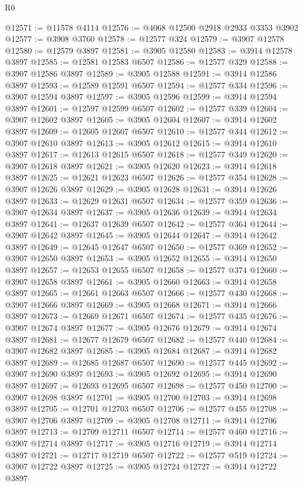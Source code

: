\begin{lexlean}{R0}
\begin{coremodule}
@12571 := @11578 @4114
@12576 := @4068 @12500 @2918 @2933 @3353 @3902
@12577 := @3908 @3760
@12578 := @12577 @324
@12579 := @3907 @12578
@12580 := @12579 @3897
@12581 := @3905 @12580
@12583 := @3914 @12578 @3897
@12585 := @12581 @12583 @6507
@12586 := @12577 @329
@12588 := @3907 @12586 @3897
@12589 := @3905 @12588
@12591 := @3914 @12586 @3897
@12593 := @12589 @12591 @6507
@12594 := @12577 @334
@12596 := @3907 @12594 @3897
@12597 := @3905 @12596
@12599 := @3914 @12594 @3897
@12601 := @12597 @12599 @6507
@12602 := @12577 @339
@12604 := @3907 @12602 @3897
@12605 := @3905 @12604
@12607 := @3914 @12602 @3897
@12609 := @12605 @12607 @6507
@12610 := @12577 @344
@12612 := @3907 @12610 @3897
@12613 := @3905 @12612
@12615 := @3914 @12610 @3897
@12617 := @12613 @12615 @6507
@12618 := @12577 @349
@12620 := @3907 @12618 @3897
@12621 := @3905 @12620
@12623 := @3914 @12618 @3897
@12625 := @12621 @12623 @6507
@12626 := @12577 @354
@12628 := @3907 @12626 @3897
@12629 := @3905 @12628
@12631 := @3914 @12626 @3897
@12633 := @12629 @12631 @6507
@12634 := @12577 @359
@12636 := @3907 @12634 @3897
@12637 := @3905 @12636
@12639 := @3914 @12634 @3897
@12641 := @12637 @12639 @6507
@12642 := @12577 @364
@12644 := @3907 @12642 @3897
@12645 := @3905 @12644
@12647 := @3914 @12642 @3897
@12649 := @12645 @12647 @6507
@12650 := @12577 @369
@12652 := @3907 @12650 @3897
@12653 := @3905 @12652
@12655 := @3914 @12650 @3897
@12657 := @12653 @12655 @6507
@12658 := @12577 @374
@12660 := @3907 @12658 @3897
@12661 := @3905 @12660
@12663 := @3914 @12658 @3897
@12665 := @12661 @12663 @6507
@12666 := @12577 @430
@12668 := @3907 @12666 @3897
@12669 := @3905 @12668
@12671 := @3914 @12666 @3897
@12673 := @12669 @12671 @6507
@12674 := @12577 @435
@12676 := @3907 @12674 @3897
@12677 := @3905 @12676
@12679 := @3914 @12674 @3897
@12681 := @12677 @12679 @6507
@12682 := @12577 @440
@12684 := @3907 @12682 @3897
@12685 := @3905 @12684
@12687 := @3914 @12682 @3897
@12689 := @12685 @12687 @6507
@12690 := @12577 @445
@12692 := @3907 @12690 @3897
@12693 := @3905 @12692
@12695 := @3914 @12690 @3897
@12697 := @12693 @12695 @6507
@12698 := @12577 @450
@12700 := @3907 @12698 @3897
@12701 := @3905 @12700
@12703 := @3914 @12698 @3897
@12705 := @12701 @12703 @6507
@12706 := @12577 @455
@12708 := @3907 @12706 @3897
@12709 := @3905 @12708
@12711 := @3914 @12706 @3897
@12713 := @12709 @12711 @6507
@12714 := @12577 @460
@12716 := @3907 @12714 @3897
@12717 := @3905 @12716
@12719 := @3914 @12714 @3897
@12721 := @12717 @12719 @6507
@12722 := @12577 @519
@12724 := @3907 @12722 @3897
@12725 := @3905 @12724
@12727 := @3914 @12722 @3897

\end{coremodule}
\end{lexlean}
